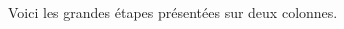 Voici les grandes étapes présentées sur deux colonnes.


\begin{multicols}{2}


\phantom{\emptybox\emptybox}%
	\deah

\emptybox\emptybox%
	\emptybox\emptybox\emptybox\emptybox\emptybox%
\emptybox\emptybox

\emptybox\emptybox%
\emptybox\emptybox

\phantom{\emptybox\emptybox}%
	\head


\medskip %

\phantom{\emptybox\emptybox\emptybox}%
	\deah

\emptybox\emptybox%
	\emptybox\emptybox\emptybox\emptybox%
\emptybox\emptybox

\emptybox\emptybox%
\emptybox\emptybox

\phantom{\emptybox\emptybox\emptybox}%
	\head


\medskip %

\phantom{\emptybox\emptybox\emptybox\emptybox}%
	\deah

\emptybox\emptybox%
	\emptybox\emptybox\emptybox%
\emptybox\emptybox

\emptybox\emptybox%
\emptybox\emptybox

\phantom{\emptybox\emptybox\emptybox\emptybox}%
	\head


\medskip %

\phantom{\emptybox\emptybox\emptybox\emptybox\emptybox}%
	\deah

\emptybox\emptybox%
	\emptybox\emptybox%
\emptybox\emptybox

\emptybox\emptybox%
\emptybox\emptybox

\phantom{\emptybox\emptybox\emptybox\emptybox\emptybox}%
	\head


\medskip %

\phantom{\emptybox\emptybox\emptybox\emptybox\emptybox\emptybox}%
	\deah

\emptybox\emptybox%
	\emptybox%
\emptybox\emptybox

\emptybox\emptybox%
\emptybox\emptybox


\end{multicols}

